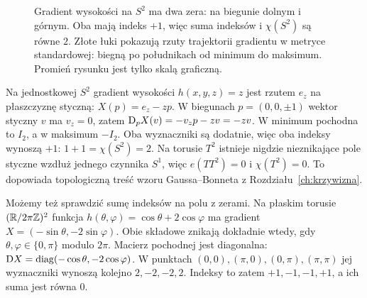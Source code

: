 \begin{figure}[H]
\centering
{}
\caption{Gradient wysokości na $S^2$
ma dwa zera: na biegunie dolnym
i górnym. Oba mają indeks $+1$,
więc suma indeksów i $\chi(S^2)$ są równe $2$.
Złote łuki pokazują rzuty trajektorii gradientu
w metryce standardowej: biegną po południkach od minimum
do maksimum. Promień rysunku jest tylko skalą graficzną.}
\label{fig:poincare-hopf-16}
\end{figure}

\begin{przyklad}
Na jednostkowej $S^2$ gradient wysokości $h(x,y,z)=z$
jest rzutem $e_z$ na płaszczyznę styczną:
$X(p)=e_z-zp$. W biegunach $p=(0,0,\pm1)$ wektor
styczny $v$ ma $v_z=0$, zatem
$\mathrm D_pX(v)=-v_zp-zv=-zv$.
W minimum pochodna to $I_2$, a w maksimum $-I_2$.
Oba wyznaczniki są dodatnie, więc oba indeksy wynoszą $+1$:
$1+1=\chi(S^2)=2$.
Na torusie $T^2$
istnieje nigdzie
nieznikające pole
styczne wzdłuż
jednego czynnika
$S^1$, więc
$e(TT^2)=0$ i
$\chi(T^2)=0$.
To dopowiada topologiczną
treść wzoru
Gaussa--Bonneta z
Rozdziału~\ref{ch:krzywizna}.

Możemy też sprawdzić sumę indeksów na polu z zerami.
Na płaskim torusie $(\mathbb{R}/2\pi\mathbb{Z})^2$ funkcja
$h(\theta,\varphi)=\cos\theta+2\cos\varphi$ ma gradient
$X=(-\sin\theta,-2\sin\varphi)$.
Obie składowe znikają dokładnie wtedy, gdy
$\theta,\varphi\in\{0,\pi\}$ modulo $2\pi$.
Macierz pochodnej jest diagonalna:
$\mathrm D X=\operatorname{diag}(-\cos\theta,-2\cos\varphi)$.
W punktach $(0,0),(\pi,0),(0,\pi),(\pi,\pi)$
jej wyznaczniki wynoszą kolejno $2,-2,-2,2$.
Indeksy to zatem $+1,-1,-1,+1$, a ich suma jest równa $0$.
\end{przyklad}

